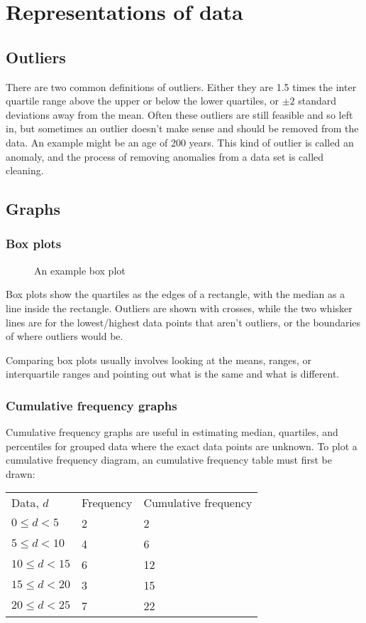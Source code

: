 \section{Representations of data}
\subsection{Outliers}
There are two common definitions of outliers. Either they are 1.5 times the inter quartile range above the upper or below the lower quartiles, or $\pm2$ standard deviations away from the mean. Often these outliers are still feasible and so left in, but sometimes an outlier doesn't make sense and should be removed from the data. An example might be an age of 200 years. This kind of outlier is called an anomaly, and the process of removing anomalies from a data set is called cleaning.

\subsection{Graphs}
\subsubsection{Box plots}
\begin{figure}[ht]
    \centering
    \caption{An example box plot}
    \label{fig:an-example-box-plot}
\end{figure}
Box plots show the quartiles as the edges of a rectangle, with the median as a line inside the rectangle. Outliers are shown with crosses, while the two whisker lines are for the lowest/highest data points that aren't outliers, or the boundaries of where outliers would be.

Comparing box plots usually involves looking at the means, ranges, or interquartile ranges and pointing out what is the same and what is different.

\subsubsection{Cumulative frequency graphs}
Cumulative frequency graphs are useful in estimating median, quartiles, and percentiles for grouped data where the exact data points are unknown. To plot a cumulative frequency diagram, an cumulative frequency table must first be drawn:
\begin{table}[ht]
\begin{tabular}{|l|l|l}
Data, $d$       & Frequency & Cumulative frequency \\
$0 \le d < 5$   & 2         & 2                    \\
$5 \le d < 10$  & 4         & 6                    \\
$10 \le d < 15$ & 6         & 12                   \\
$15 \le d < 20$ & 3         & 15                   \\
$20 \le d < 25$ & 7         & 22                  
\end{tabular}
\end{table}

